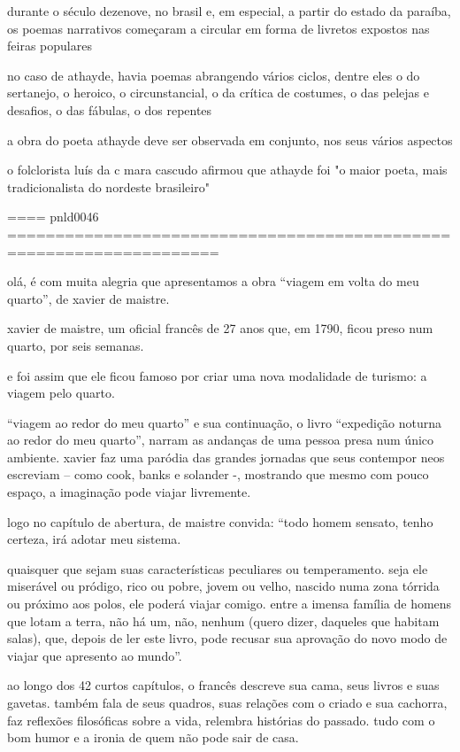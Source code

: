 durante o século dezenove,  no brasil e, em especial, a partir do estado da paraíba, os poemas narrativos começaram a circular em forma de livretos expostos nas feiras populares

no caso de athayde, havia poemas abrangendo vários ciclos, dentre eles o do sertanejo, o heroico, o circunstancial, o da crítica de costumes, o das pelejas e desafios, o das fábulas, o dos repentes

a obra do poeta athayde deve ser observada em conjunto, nos seus vários aspectos

o folclorista luís da c mara cascudo afirmou que athayde foi "o maior poeta, mais tradicionalista do nordeste brasileiro"


==== pnld0046 ====================================================================

olá,
é com muita alegria que apresentamos a obra “viagem em volta do meu quarto”, de xavier de maistre.


xavier de maistre, um oficial francês de 27 anos que, em 1790, ficou preso num quarto, por seis semanas.

e foi assim que ele ficou famoso por criar uma nova modalidade de turismo: a viagem pelo quarto.

“viagem ao redor do meu quarto” e sua continuação, o livro “expedição noturna ao redor do meu quarto”, narram as andanças de uma pessoa presa num único ambiente. xavier faz uma paródia das grandes jornadas que seus contempor neos escreviam – como cook, banks e solander -, mostrando que mesmo com pouco espaço, a imaginação pode viajar livremente.

logo no capítulo de abertura, de maistre convida: “todo homem sensato, tenho certeza, irá adotar meu sistema. 

quaisquer que sejam suas características peculiares ou temperamento. seja ele miserável ou pródigo, rico ou pobre, jovem ou velho, nascido numa zona tórrida ou próximo aos polos, ele poderá viajar comigo. entre a imensa família de homens que lotam a terra, não há um, não, nenhum (quero dizer, daqueles que habitam salas), que, depois de ler este livro, pode recusar sua aprovação do novo modo de viajar que apresento ao mundo”.

ao longo dos 42 curtos capítulos, o francês descreve sua cama, seus livros e suas gavetas. também fala de seus quadros, suas relações com o criado e sua cachorra, faz reflexões filosóficas sobre a vida, relembra histórias do passado. tudo com o bom humor e a ironia de quem não pode sair de casa. 


